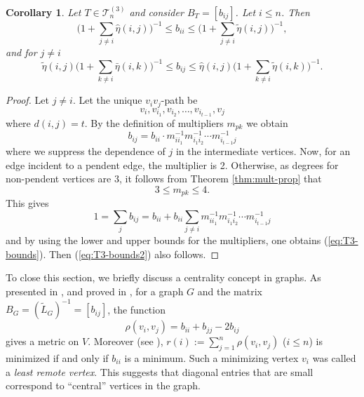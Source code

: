 \documentclass[12pt]{article}
\newtheorem{corollary}[theorem]{Corollary}
\newcommand{\mc}{\mathcal}
\begin{document}
\begin{corollary}
  \label{cor:3-trees}
  Let $T \in\mc{T}^{(3)}_n$ and consider $B_T=[b_{ij}]$. Let $i \le n$. Then 
  \begin{equation}
    \label{eq:T3-bounds} 
    \big(1+\sum_{j\not = i} \hat{\eta}(i,j) \big)^{-1} \le 
    b_{ii} \le \big(1+\sum_{j\not = i} \tilde{\eta}(i,j) \big)^{-1},
  \end{equation}
  and for $j \not = i$
    \begin{equation}
    \label{eq:T3-bounds2} 
    \tilde{\eta}(i,j)\big(1+\sum_{k\not = i} \bar{\eta}(i,k) \big)^{-1} 
    \le 
    b_{ij} \le \hat{\eta}(i,j)\big(1+\sum_{k\not = i} \tilde{\eta}(i,k) \big)^{-1}.
  \end{equation}
\end{corollary}

%
\begin{proof}
  Let $j \not = i$. Let the unique $v_iv_j$-path be 
  \[
    v_i, v_{i_1}, v_{i_2}, \ldots, v_{i_{t-1}}, v_j  
  \]
%
where $d(i,j)=t$. By the definition of multipliers $m_{pk}$ we obtain 
  \[
    b_{ij}=b_{ii} \cdot m_{ii_1}^{-1}m_{i_1i_2}^{-1} \cdots m_{i_{t-1}j}^{-1}  
  \]
%
 where we suppress the dependence of $j$ in the intermediate vertices.  Now, for an edge incident to a pendent edge, the multiplier is 2. Otherwise, as degrees for non-pendent vertices are $3$, it follows from Theorem \ref{thm:mult-prop} that
 \[
     3 \le m_{pk} \le 4.
 \]
 This gives
 \begin{equation}
  \label{eq:bii_rel}   
   1=\sum_j b_{ij}=b_{ii}+b_{ii}\sum_{j \not = i} m_{ii_1}^{-1}m_{i_1i_2}^{-1} \cdots m_{i_{t-1}j}^{-1}
 \end{equation}
 and by using the lower and upper bounds for the multipliers, one obtains (\ref{eq:T3-bounds}). Then  (\ref{eq:T3-bounds2}) also follows. 
\end{proof}


To close this section, we briefly discuss a centrality concept in graphs. 
As presented in \cite{Merris_II}, and proved in \cite{Chebotarev}, for a graph $G$ and the matrix $B_G=(\tilde{L}_G)^{-1}=[b_{ij}]$, the function 
\[
  \rho(v_i,v_j)=b_{ii}+b_{jj}-2b_{ij}
\]
%
gives a metric on $V$. Moreover (see \cite{Merris_II}),   
$r(i):=\sum_{j=1}^n \rho(v_i,v_j)$ ($i \le n$)
is minimized if and only if $b_{ii}$ is a minimum. Such a minimizing vertex  $v_i$  was called a {\em least remote vertex}. This suggests that diagonal entries that are small correspond to ``central'' vertices in the graph. 
\end{document}
